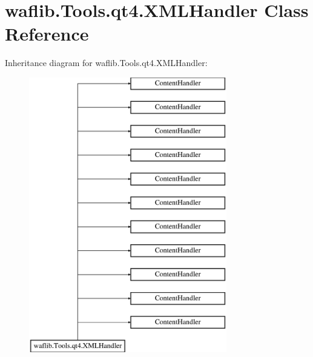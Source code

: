 \hypertarget{classwaflib_1_1_tools_1_1qt4_1_1_x_m_l_handler}{}\section{waflib.\+Tools.\+qt4.\+X\+M\+L\+Handler Class Reference}
\label{classwaflib_1_1_tools_1_1qt4_1_1_x_m_l_handler}
Inheritance diagram for waflib.\+Tools.\+qt4.\+X\+M\+L\+Handler\+:\begin{figure}[H]
\begin{center}
\leavevmode
\includegraphics[height=12.000000cm]{classwaflib_1_1_tools_1_1qt4_1_1_x_m_l_handler}
\end{center}
\end{figure}
